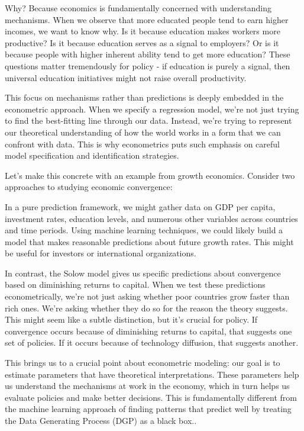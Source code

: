 \documentclass[10pt]{article}
\begin{document}
Why? Because economics is fundamentally concerned with understanding mechanisms. When we observe that more educated people tend to earn higher incomes, we want to know why. Is it because education makes workers more productive? Is it because education serves as a signal to employers? Or is it because people with higher inherent ability tend to get more education? These questions matter tremendously for policy - if education is purely a signal, then universal education initiatives might not raise overall productivity.

This focus on mechanisms rather than predictions is deeply embedded in the econometric approach. When we specify a regression model, we're not just trying to find the best-fitting line through our data. Instead, we're trying to represent our theoretical understanding of how the world works in a form that we can confront with data. This is why econometrics puts such emphasis on careful model specification and identification strategies.

Let's make this concrete with an example from growth economics. Consider two approaches to studying economic convergence:

In a pure prediction framework, we might gather data on GDP per capita, investment rates, education levels, and numerous other variables across countries and time periods. Using machine learning techniques, we could likely build a model that makes reasonable predictions about future growth rates. This might be useful for investors or international organizations.

In contrast, the Solow model gives us specific predictions about convergence based on diminishing returns to capital. When we test these predictions econometrically, we're not just asking whether poor countries grow faster than rich ones. We're asking whether they do so for the reason the theory suggests. This might seem like a subtle distinction, but it's crucial for policy. If convergence occurs because of diminishing returns to capital, that suggests one set of policies. If it occurs because of technology diffusion, that suggests another.

This brings us to a crucial point about econometric modeling: our goal is to estimate parameters that have theoretical interpretations. These parameters help us understand the mechanisms at work in the economy, which in turn helps us evaluate policies and make better decisions. This is fundamentally different from the machine learning approach of finding patterns that predict well by treating the Data Generating Process (DGP) as a black box..
\end{document}
